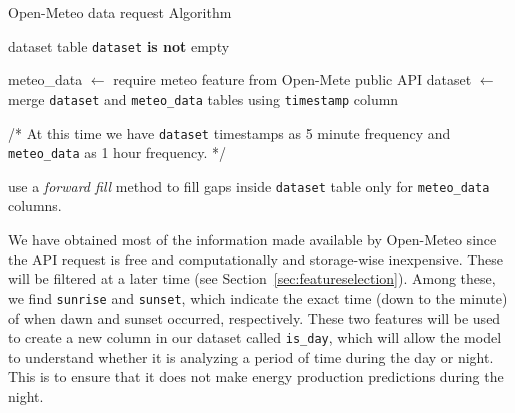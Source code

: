 
\begin{algorithm}[H]
	\caption{Open-Meteo data request Algorithm}\label{alg:openemeteo}
	\begin{algorithmic}
		\Require dataset table
		\Ensure \texttt{dataset} \textbf{is not} empty

		\State meteo\_data $\gets$ require meteo feature from Open-Mete public API
		\State dataset $\gets$ merge \texttt{dataset} and \texttt{meteo\_data} tables using \texttt{timestamp} column

		\State
		\State /* At this time we have \texttt{dataset} timestamps as 5 minute frequency and \texttt{meteo\_data} as 1 hour frequency. */
		\State

		\State use a \textit{forward fill} method to fill gaps inside \texttt{dataset} table only for \texttt{meteo\_data} columns.
	\end{algorithmic}
\end{algorithm}

We have obtained most of the information made available by Open-Meteo since the API
request is free\cite{openmeteo} and computationally and storage-wise inexpensive.
These will be filtered at a later time (see Section~\ref{sec:featureselection}).
Among these, we find \texttt{sunrise} and \texttt{sunset}, which indicate the exact time
(down to the minute) of when dawn and sunset occurred, respectively.
These two features will be used to create a new column in our dataset called
\texttt{is\_day}, which will allow the model to understand whether it is
analyzing a period of time during the day or night.
This is to ensure that it does not make energy production predictions
during the night.


